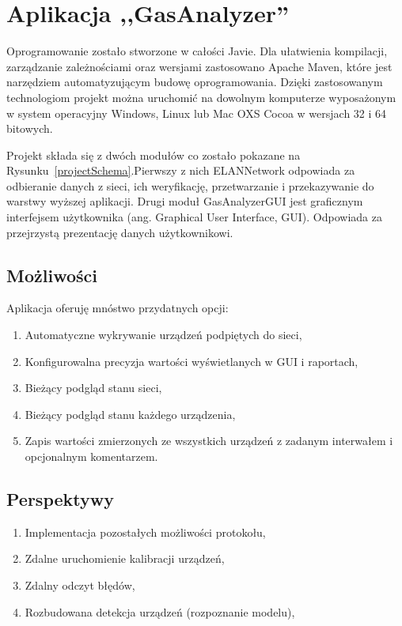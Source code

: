 \section{Aplikacja ,,GasAnalyzer''}
Oprogramowanie zostało stworzone w całości Javie. Dla ułatwienia kompilacji, zarządzanie zależnościami oraz wersjami zastosowano Apache Maven, które jest narzędziem automatyzującym budowę oprogramowania. Dzięki zastosowanym technologiom projekt można uruchomić na dowolnym komputerze wyposażonym w system operacyjny Windows, Linux lub Mac OXS Cocoa w wersjach 32 i 64 bitowych.

Projekt składa się z dwóch modułów co zostało pokazane na Rysunku~\ref{projectSchema}.Pierwszy z nich ELANNetwork odpowiada za odbieranie danych z sieci, ich weryfikację, przetwarzanie i przekazywanie do warstwy wyższej aplikacji.
Drugi moduł GasAnalyzerGUI jest graficznym interfejsem użytkownika (ang. Graphical User Interface, GUI). Odpowiada za przejrzystą prezentację danych użytkownikowi.



\subsection{Możliwości}
Aplikacja oferuję mnóstwo przydatnych opcji:
\begin{enumerate}
\item Automatyczne wykrywanie urządzeń podpiętych do sieci,
\item Konfigurowalna precyzja wartości wyświetlanych w GUI i raportach,
\item Bieżący podgląd stanu sieci,
\item Bieżący podgląd stanu każdego urządzenia,
\item Zapis wartości zmierzonych ze wszystkich urządzeń z zadanym interwałem i opcjonalnym komentarzem.
\end{enumerate}

\subsection{Perspektywy}
\begin{enumerate}
\item Implementacja pozostałych możliwości protokołu,
\item Zdalne uruchomienie kalibracji urządzeń,
\item Zdalny odczyt błędów,
\item Rozbudowana detekcja urządzeń (rozpoznanie modelu),
\end{enumerate}